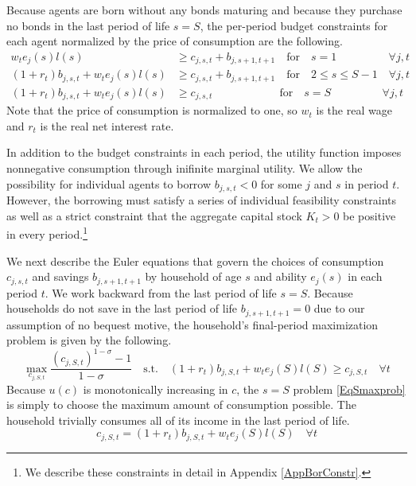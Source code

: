 \documentclass[letterpaper,12pt]{article}
\theoremstyle{definition}
\begin{document}
\begin{spacing}{1.5}
    Because agents are born without any bonds maturing and because they purchase no bonds in the last period of life $s=S$, the per-period budget constraints for each agent normalized by the price of consumption are the following.
    \begin{align}
      w_t e_j(s)l(s) &\geq c_{j,s,t} + b_{j,s+1,t+1} \quad \text{for} \quad s = 1 \quad\quad\quad\quad\:\:\: \forall j,t \label{EqBC1} \\
      \left(1 + r_t\right) b_{j,s,t} + w_t e_j(s)l(s) &\geq c_{j,s,t} + b_{j,s+1,t+1} \quad \text{for} \quad 2\leq s \leq S-1 \quad \forall j,t \label{EqBC2} \\
      \left(1 + r_t\right) b_{j,s,t} + w_t e_j(s)l(s) &\geq c_{j,s,t} \quad\quad\quad\quad\quad\quad \text{for} \quad s = S \quad\quad\quad\quad\:\:\, \forall j,t \label{EqBC3}
    \end{align}
    Note that the price of consumption is normalized to one, so $w_t$ is the real wage and $r_t$ is the real net interest rate.

    In addition to the budget constraints in each period, the utility function imposes nonnegative consumption through inifinite marginal utility. We allow the possibility for individual agents to borrow $b_{j,s,t}<0$ for some $j$ and $s$ in period $t$. However, the borrowing must satisfy a series of individual feasibility constraints as well as a strict constraint that the aggregate capital stock $K_t>0$ be positive in every period.\footnote{We describe these constraints in detail in Appendix \ref{AppBorConstr}.}

    We next describe the Euler equations that govern the choices of consumption $c_{j,s,t}$ and savings $b_{j,s+1,t+1}$ by household of age $s$ and ability $e_j(s)$ in each period $t$. We work backward from the last period of life $s = S$. Because households do not save in the last period of life $b_{j,s+1,t+1}=0$ due to our assumption of no bequest motive, the household's final-period maximization problem is given by the following.
    \begin{equation}\label{EqSmaxprob}
      \max_{c_{j,S,t}} \frac{\left(c_{j,S,t}\right)^{1-\sigma} - 1}{1 - \sigma} \quad \text{s.t.} \quad \left(1+r_t\right)b_{j,S,t} + w_t e_j(S)l(S) \geq c_{j,S,t} \quad \forall t
    \end{equation}
    Because $u(c)$ is monotonically increasing in $c$, the $s=S$ problem \eqref{EqSmaxprob} is simply to choose the maximum amount of consumption possible. The household trivially consumes all of its income in the last period of life.
    \begin{equation}\label{EqScons}
      c_{j,S,t} = \left(1+r_t\right)b_{j,S,t} + w_t e_j(S)l(S) \quad \forall t
    \end{equation}


\end{spacing}
\end{document}
